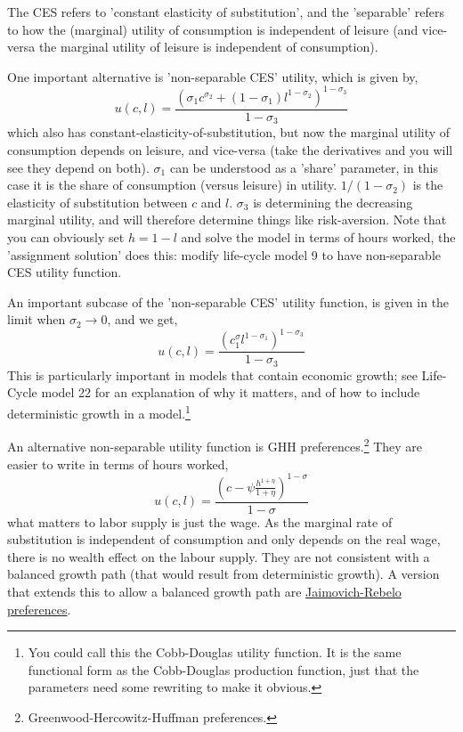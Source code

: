 The CES refers to 'constant elasticity of substitution', and the 'separable' refers to how the (marginal) utility of consumption is independent of leisure (and vice-versa the marginal utility of leisure is independent of consumption).

One important alternative is 'non-separable CES' utility, which is given by,
\begin{equation*}
 u(c,l)=\frac{(\sigma_1 c^{\sigma_2} + (1-\sigma_1) l^{1-\sigma_2})^{1-\sigma_3}}{1-\sigma_3}
\end{equation*}
which also has constant-elasticity-of-substitution, but now the marginal utility of consumption depends on leisure, and vice-versa (take the derivatives and you will see they depend on both). $\sigma_1$ can be understood as a 'share' parameter, in this case it is the share of consumption (versus leisure) in utility. $1/(1-\sigma_2)$ is the elasticity of substitution between $c$ and $l$. $\sigma_3$ is determining the decreasing marginal utility, and will therefore determine things like risk-aversion. Note that you can obviously set $h=1-l$ and solve the model in terms of hours worked, the 'assignment solution' does this: modify life-cycle model 9 to have non-separable CES utility function.

An important subcase of the 'non-separable CES' utility function, is given in the limit when $\sigma_2 \to 0$, and we get,
\begin{equation*}
 u(c,l)=\frac{(c^\sigma_1 l^{1-\sigma_1})^{1-\sigma_3}}{1-\sigma_3}
\end{equation*}
This is particularly important in models that contain economic growth; see Life-Cycle model 22 for an explanation of why it matters, and of how to include deterministic growth in a model.\footnote{You could call this the Cobb-Douglas utility function. It is the same functional form as the Cobb-Douglas production function,  just that the parameters need some rewriting to make it obvious.}

An alternative non-separable utility function is GHH preferences.\footnote{Greenwood-Hercowitz-Huffman preferences.} They are easier to write in terms of hours worked,
\begin{equation*}
 u(c,l)= \frac{ \left(c - \psi \frac{h^{1+\eta}}{1+\eta} \right)^{1-\sigma} }{1-\sigma}
\end{equation*}
what matters to labor supply is just the wage. As the marginal rate of substitution is independent of consumption and only depends on the real wage, there is no wealth effect on the labour supply. They are not consistent with a balanced growth path (that would result from deterministic growth). A version that extends this to allow a balanced growth path are \href{https://en.wikipedia.org/wiki/Jaimovich\%E2\%80\%93Rebelo_preferences}{Jaimovich-Rebelo preferences}.


